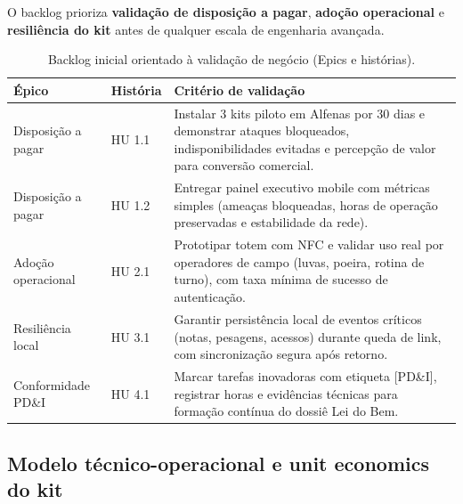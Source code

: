 O backlog prioriza \textbf{validação de disposição a pagar}, \textbf{adoção operacional} e \textbf{resiliência do kit} antes de qualquer escala de engenharia avançada.

\begin{table}[htb]
\centering
\caption{Backlog inicial orientado à validação de negócio (Epics e histórias).}
\label{tab:backlog-validacao}
\begin{tabular}{|p{}|p{}|p{}|}
\hline
\textbf{Épico} & \textbf{História} & \textbf{Critério de validação} \\
\hline
Disposição a pagar & HU 1.1 & Instalar 3 kits piloto em Alfenas por 30 dias e demonstrar ataques bloqueados, indisponibilidades evitadas e percepção de valor para conversão comercial. \\
\hline
Disposição a pagar & HU 1.2 & Entregar painel executivo mobile com métricas simples (ameaças bloqueadas, horas de operação preservadas e estabilidade da rede). \\
\hline
Adoção operacional & HU 2.1 & Prototipar totem com NFC e validar uso real por operadores de campo (luvas, poeira, rotina de turno), com taxa mínima de sucesso de autenticação. \\
\hline
Resiliência local & HU 3.1 & Garantir persistência local de eventos críticos (notas, pesagens, acessos) durante queda de link, com sincronização segura após retorno. \\
\hline
Conformidade PD\&I & HU 4.1 & Marcar tarefas inovadoras com etiqueta [PD\&I], registrar horas e evidências técnicas para formação contínua do dossiê Lei do Bem. \\
\hline
\end{tabular}
\end{table}

\subsection{Modelo técnico-operacional e unit economics do kit}

